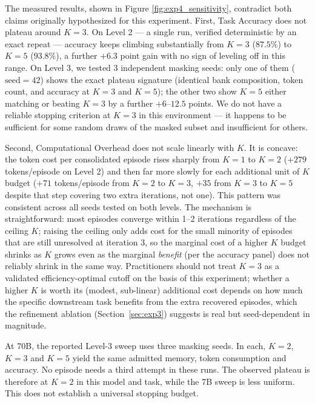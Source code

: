 The measured results, shown in Figure \ref{fig:exp4_sensitivity}, contradict both claims originally hypothesized for this experiment. First, Task Accuracy does not plateau around $K=3$. On Level 2 --- a single run, verified deterministic by an exact repeat --- accuracy keeps climbing substantially from $K{=}3$ ($87.5\%$) to $K{=}5$ ($93.8\%$), a further $+6.3$ point gain with no sign of leveling off in this range. On Level 3, we tested 3 independent masking seeds: only one of them ($\text{seed}=42$) shows the exact plateau signature (identical bank composition, token count, and accuracy at $K{=}3$ and $K{=}5$); the other two show $K{=}5$ either matching or beating $K{=}3$ by a further $+6$--$12.5$ points. We do not have a reliable stopping criterion at $K=3$ in this environment --- it happens to be sufficient for some random draws of the masked subset and insufficient for others.

Second, Computational Overhead does not scale linearly with $K$. It is concave: the token cost per consolidated episode rises sharply from $K{=}1$ to $K{=}2$ ($+279$ tokens/episode on Level 2) and then far more slowly for each additional unit of $K$ budget ($+71$ tokens/episode from $K{=}2$ to $K{=}3$, $+35$ from $K{=}3$ to $K{=}5$ despite that step covering two extra iterations, not one). This pattern was consistent across all seeds tested on both levels. The mechanism is straightforward: most episodes converge within 1--2 iterations regardless of the ceiling $K$; raising the ceiling only adds cost for the small minority of episodes that are still unresolved at iteration 3, so the marginal cost of a higher $K$ budget shrinks as $K$ grows even as the marginal \emph{benefit} (per the accuracy panel) does not reliably shrink in the same way. Practitioners should not treat $K=3$ as a validated efficiency-optimal cutoff on the basis of this experiment; whether a higher $K$ is worth its (modest, sub-linear) additional cost depends on how much the specific downstream task benefits from the extra recovered episodes, which the refinement ablation (Section~\ref{sec:exp3}) suggests is real but seed-dependent in magnitude.

At 70B, the reported Level-3 sweep uses three masking seeds. In each, $K=2$, $K=3$ and $K=5$ yield the same admitted memory, token consumption and accuracy. No episode needs a third attempt in these runs. The observed plateau is therefore at $K=2$ in this model and task, while the 7B sweep is less uniform. This does not establish a universal stopping budget.

